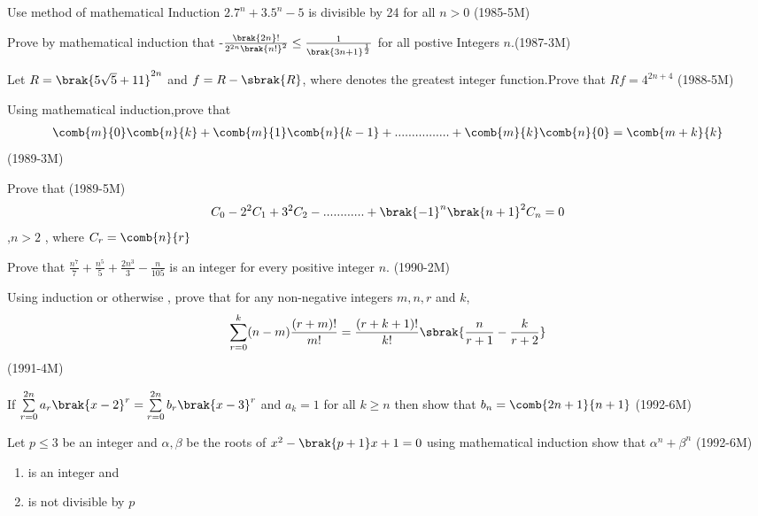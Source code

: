  \item Use method of mathematical Induction  $ 2.7^n +3.5^n-5 $ is divisible by 24 for all $ n>0 $ \hfill{(1985-5M)}
 \item Prove by mathematical induction that -$\frac{\brak{2n}!}{2^{2n}\brak{n!}^2}\leq \frac{1}{\brak{3n+1}^{\frac{1}{2}}} $ for all postive Integers $n$.\hfill {(1987-3M)}
  \item Let $ R =\brak{5\sqrt{5}+11}^{2n} $ and $ f = R -\sbrak{R} $, where \sbrak{} denotes the greatest integer function.Prove  that $ Rf =4^{2n+4 } $  \hfill {(1988-5M)}
 \item Using mathematical induction,prove that
		    \begin{align*} \comb{m}{0}\comb{n}{k} +\comb{m}{1}\comb{n}{k-1}+................+\comb{m}{k}\comb{n}{0} =\comb{m+k}{k} \end{align*}  \hfill{(1989-3M)}
\item Prove that \hfill{(1989-5M)}
		    \begin{align*} 
		    C_0-2^2C_1+3^2C_2-............+\brak{-1}^n\brak{n+1}^2C_n =0
		    \end{align*},$n>2$ , where $C_r =\comb{n}{r}$
		    

 \item Prove that   $ \frac{n^7}{7}+\frac{n^5}{5}+\frac{2n^3}{3}-\frac{n}{105}$ is an integer for every positive integer $ n$. \hfill{(1990-2M)}
 \item Using induction or otherwise , prove that for any non-negative integers $m,n,r$ and $ k$,
		    \begin{align*} 
			    \sum_{r=0}^{k}(n-m)\frac{(r+m)!}{m!}= \frac{(r+k+1)!}{k!}\sbrak{\frac{n}{r+1}-\frac{k}{r+2}}
		    \end{align*}
		     \hfill{(1991-4M)} 

 \item If $ \sum\limits_{r=0}^{2n} a_r \brak{x-2}^r=\sum\limits_{r=0}^{2n}b_r \brak{x-3}^r $ and $ a_k =1 $ for all $k \geq  n$ then show that $ b_n = \comb{2n+1}{n+1} $ \hfill{(1992-6M)}

  \item Let $ p \leq 3 $ be an integer and $ \alpha , \beta $ be  the roots of $ x^2-\brak{p+1}x+1=0 $ using mathematical induction show that $ \alpha^n  + \beta^n $ \hfill{(1992-6M)}
		    \begin{enumerate}[label=(\roman*)]

			    \item is an integer and   
		    \item is not divisible by $ p $ \end{enumerate}
				    
		    
    
